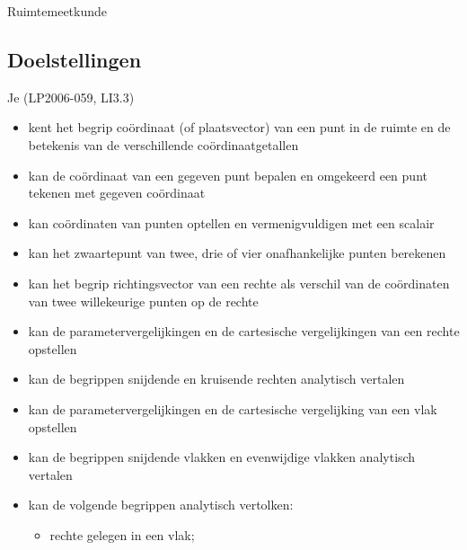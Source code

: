 \documentclass[12pt,twoside]{article}
\begin{document}
\pagestyle{fancy}
\lhead{}

\begin{theorie}

  \thispagestyle{empty}
  \begin{center}
    \begin{mdframed}
      \centering
      \fontsize{40}{60}\selectfont Ruimtemeetkunde
    \end{mdframed}
    \vfill
    \vfill
  \end{center}

  \subsection*{Doelstellingen}
  \vspace*{-0.8cm}
  {\singlespacing\small
    Je \hfill  {\scriptsize(LP2006-059, LI3.3)}
    \begin{itemize}
    \itemsep-0.3em
    \vspace*{-0.4cm}
    \item kent het begrip coördinaat (of plaatsvector) van een punt in de ruimte en de betekenis van de verschillende coördinaatgetallen
    \item kan de coördinaat van een gegeven punt bepalen en omgekeerd een punt tekenen met gegeven coördinaat
    \item kan coördinaten van punten optellen en vermenigvuldigen met een scalair
    \item kan het zwaartepunt van twee, drie of vier onafhankelijke punten berekenen
    \item kan het begrip richtingsvector van een rechte als verschil van de coördinaten van twee willekeurige punten op de rechte
    \item kan de parametervergelijkingen en de cartesische vergelijkingen van een rechte opstellen
    \item kan de begrippen snijdende en kruisende rechten analytisch vertalen
    \item kan de parametervergelijkingen en de cartesische vergelijking van een vlak opstellen
    \item kan de begrippen snijdende vlakken en evenwijdige vlakken analytisch vertalen
    \item kan de volgende begrippen analytisch vertolken:
    \begin{itemize}
    \itemsep-0.5em
  \vspace*{-0.2cm}
      \item rechte gelegen in een vlak;

\end{itemize}
\end{itemize}}
\end{theorie}
\end{document}
